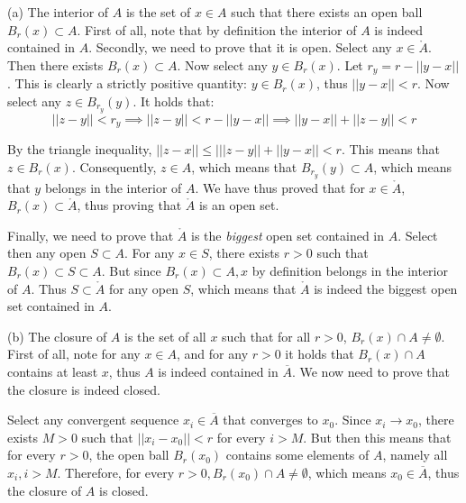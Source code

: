 \begin{solution}

    (a) The interior of $A$ is the set of $x \in A$ such that there exists an open ball $B_r(x) \subset A$. First of all, note that by definition the interior of $A$ is indeed contained in $A$. Secondly, we need to prove that it is open. Select any $x \in \mathring{A}$. Then there exists $B_r(x) \subset A$. Now select any $y \in B_r(x)$. Let $r_y = r - \lvert \lvert y - x \rvert \rvert$. This is clearly a strictly positive quantity: $y \in B_r(x)$, thus $\lvert \lvert y - x \rvert \rvert < r$. Now select any $z \in B_{r_y}(y)$. It holds that: 
    $$\lvert \lvert z - y \rvert \rvert < r_y \implies \lvert \lvert z - y \rvert \rvert < r - \lvert \lvert y -x \rvert \rvert \implies \lvert \lvert y - x\rvert \rvert + \lvert \lvert z - y \rvert \rvert < r$$

    By the triangle inequality, $\lvert \lvert z - x \rvert \rvert \leq \lvert \lvert \lvert z - y \rvert \rvert + \lvert \lvert y -x \rvert \rvert < r$. This means that $z \in B_r(x)$. Consequently, $z \in A$, which means that $B_{r_y}(y) \subset A$, which means that $y$ belongs in the interior of $A$. We have thus proved that for $x \in \mathring{A}$, $B_r(x) \subset \mathring{A}$, thus proving that $\mathring{A}$ is an open set.

    Finally, we need to prove that $\mathring{A}$ is the \textit{biggest} open set contained in $A$. Select then any open $S \subset A$. For any $x \in S$, there exists $r > 0$ such that $B_r(x) \subset S \subset A$. But since $B_r(x) \subset A, x$ by definition belongs in the interior of $A$. Thus $S \subset \mathring{A}$ for any open $S$, which means that $\mathring{A}$ is indeed the biggest open set contained in $A$.

    (b) The closure of $A$ is the set of all $x$ such that for all $r > 0$, $B_r(x) \cap A \neq \emptyset$. First of all, note for any $x \in A$, and for any $r > 0$ it holds that $B_r(x) \cap A$ contains at least $x$, thus $A$ is indeed contained in $\overline{A}$. We now need to prove that the closure is indeed closed.

    Select any convergent sequence $x_i \in \overline{A}$ that converges to $x_0$. Since $x_i \rightarrow x_0$, there exists $M > 0$ such that $\lvert \lvert x_i - x_0 \rvert \rvert < r$ for every $i > M$. But then this means that for every $r > 0$, the open ball $B_r(x_0)$ contains some elements of $A$, namely all $x_i, i > M$. Therefore, for every $r > 0, B_r(x_0) \cap A \neq \emptyset$, which means $x_0 \in \overline{A}$, thus the closure of $A$ is closed.


\end{solution}
